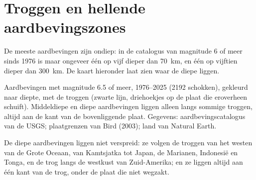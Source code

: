 \section{Troggen en hellende aardbevingszones}

De meeste aardbevingen zijn ondiep: in de catalogus van magnitude 6 of meer sinds
1976 is maar ongeveer één op vijf dieper dan \qty{70}{km}, en één op vijftien
dieper dan \qty{300}{km}. De kaart hieronder laat zien waar de diepe liggen.

\begin{omfigure}

{\small Aardbevingen met magnitude 6.5 of meer, 1976--2025 (2192 schokken),
gekleurd naar diepte, met de troggen (zwarte lijn, driehoekjes op de plaat die
eroverheen schuift). Middeldiepe en diepe aardbevingen liggen alleen langs sommige
troggen, altijd aan de kant van de bovenliggende plaat. Gegevens: aardbevingscatalogus
van de USGS; plaatgrenzen van Bird (2003); land van Natural Earth.}
\end{omfigure}

De diepe aardbevingen liggen niet verspreid: ze volgen de troggen van het
westen van de Grote Oceaan, van Kamtsjatka tot Japan, de Marianen, Indonesië en Tonga,
en de trog langs de westkust van Zuid-Amerika; en ze liggen altijd aan
één kant van de trog, onder de plaat die niet wegzakt.

